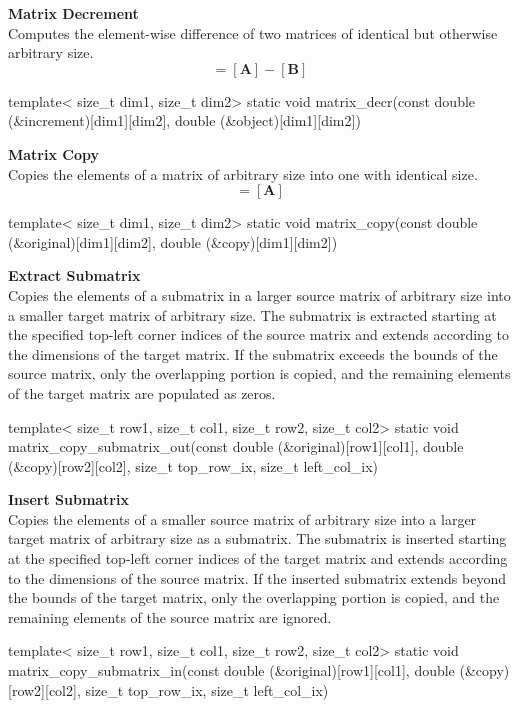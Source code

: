 \documentclass[11pt,fleqn]{report}
\begin{document}
\textbf{Matrix Decrement}\\
Computes the element-wise difference of two matrices of identical 
but otherwise arbitrary size.
\begin{equation*}
[\textbf{Y}] = [\textbf{A}] - [\textbf{B}]
\end{equation*}
\begin{code}
template< size_t dim1, size_t dim2>
static void matrix_decr(const double (&increment)[dim1][dim2],
                        double (&object)[dim1][dim2])
\end{code}

\textbf{Matrix Copy}\\
Copies the elements of a matrix of arbitrary size into one with identical
size.
\begin{equation*}
[\textbf{Y}] = [\textbf{A}]
\end{equation*}
\begin{code}
template< size_t dim1, size_t dim2>
static void matrix_copy(const double (&original)[dim1][dim2],
                        double (&copy)[dim1][dim2])
\end{code}

\textbf{Extract Submatrix}\\
Copies the elements of a submatrix in a larger source matrix of arbitrary size into a
smaller target matrix of arbitrary size. The submatrix is extracted starting at 
the specified top-left corner indices of the source matrix and extends according to the 
dimensions of the target matrix. If the submatrix exceeds the bounds of the
source matrix, only the overlapping portion is copied, and the remaining elements of the 
target matrix are populated as zeros.
\begin{code}
template< size_t row1, size_t col1, size_t row2, size_t col2>
static void matrix_copy_submatrix_out(const double (&original)[row1][col1],
                                      double (&copy)[row2][col2],
                                      size_t top_row_ix,
                                      size_t left_col_ix)
\end{code}

\textbf{Insert Submatrix}\\
Copies the elements of a smaller source matrix of arbitrary size into a
larger target matrix of arbitrary size as a submatrix. The submatrix is inserted starting at 
the specified top-left corner indices of the target matrix and extends according to the 
dimensions of the source matrix. If the inserted submatrix extends beyond the bounds of the
target matrix, only the overlapping portion is copied, and the remaining elements of the 
source matrix are ignored.
\begin{code}
template< size_t row1, size_t col1, size_t row2, size_t col2>
static void matrix_copy_submatrix_in(const double (&original)[row1][col1],
                                     double (&copy)[row2][col2],
                                     size_t top_row_ix,
                                     size_t left_col_ix)
\end{code}
\end{document}
